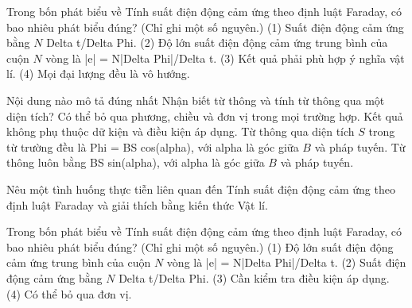 \begin{ex}
Trong bốn phát biểu về Tính suất điện động cảm ứng theo định luật Faraday, có bao nhiêu phát biểu đúng? (Chỉ ghi một số nguyên.) (1) Suất điện động cảm ứng bằng $N$ Delta t/Delta Phi. (2) Độ lớn suất điện động cảm ứng trung bình của cuộn $N$ vòng là |e| = N|Delta Phi|/Delta t. (3) Kết quả phải phù hợp ý nghĩa vật lí. (4) Mọi đại lượng đều là vô hướng.
\end{ex}

\begin{ex}
Nội dung nào mô tả đúng nhất Nhận biết từ thông và tính từ thông qua một diện tích?
\choice
{Có thể bỏ qua phương, chiều và đơn vị trong mọi trường hợp.}
{Kết quả không phụ thuộc dữ kiện và điều kiện áp dụng.}
{\True Từ thông qua diện tích $S$ trong từ trường đều là Phi = BS cos(alpha), với alpha là góc giữa $B$ và pháp tuyến.}
{Từ thông luôn bằng BS sin(alpha), với alpha là góc giữa $B$ và pháp tuyến.}
\end{ex}

\begin{bt}
Nêu một tình huống thực tiễn liên quan đến Tính suất điện động cảm ứng theo định luật Faraday và giải thích bằng kiến thức Vật lí.
\end{bt}

\begin{ex}
Trong bốn phát biểu về Tính suất điện động cảm ứng theo định luật Faraday, có bao nhiêu phát biểu đúng? (Chỉ ghi một số nguyên.) (1) Độ lớn suất điện động cảm ứng trung bình của cuộn $N$ vòng là |e| = N|Delta Phi|/Delta t. (2) Suất điện động cảm ứng bằng $N$ Delta t/Delta Phi. (3) Cần kiểm tra điều kiện áp dụng. (4) Có thể bỏ qua đơn vị.
\end{ex}

